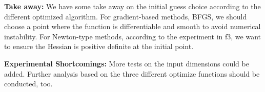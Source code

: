\documentclass[12pt]{article}
\begin{document}
\textbf{Take away: } We have some take away on the initial guess choice according to the different optimized algorithm. For gradient-based methods, BFGS, we should choose a point where the function is differentiable and smooth to avoid numerical instability. For Newton-type methods, according to the experiment in f3, we want to ensure the Hessian is positive definite at the initial point. 

\textbf{Experimental Shortcomings: } More tests on the input dimensions could be added. Further analysis based on the three different optimize functions should be conducted, too.




\end{document}
